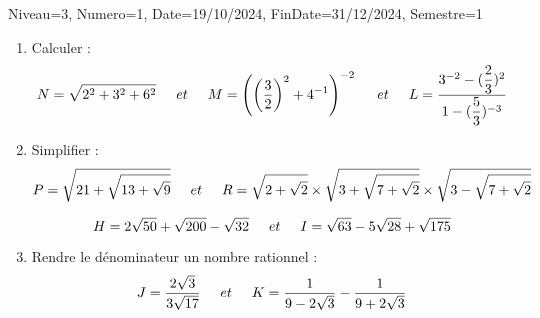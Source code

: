 \documentclass[a4paper,12pt]{article}
\begin{document}
\begin{Maquette}[DM]{Niveau=3, Numero=1, Date=19/10/2024, FinDate=31/12/2024, Semestre=1}
\begin{exercice}
\begin{enumerate}
\item Calculer :
\[
N=\sqrt{2^{2}+3^{2}+6^{2}}\hspace*{0.5cm}et\hspace*{0.5cm}
M=\left( \left( \dfrac{3}{2}\right)^{2}+4^{-1}\right)^{-2}  \hspace*{0.5cm}et\hspace*{0.5cm}
L=\dfrac{3^{-2}-(\dfrac{2}{3})^{2}}{1-(\dfrac{5}{3})^{-3}}
\]
\item Simplifier :
\[
P=\sqrt{21+\sqrt{13+\sqrt{9}}}\hspace*{0.5cm}et\hspace*{0.5cm}
R=\sqrt{2+\sqrt{2}}\times \sqrt{3+\sqrt{7+\sqrt{2}}}\times \sqrt{3-\sqrt{7+\sqrt{2}}}
\]

\[
H=2\sqrt{50}+\sqrt{200}-\sqrt{32}\hspace*{0.5 cm}et\hspace*{0.5 cm}
I=\sqrt{63}-5\sqrt{28}+\sqrt{175}
\]
\item Rendre le dénominateur un nombre rationnel :
\[
J=\dfrac{2\sqrt{3}}{3\sqrt{17}}\hspace*{0.5 cm}et\hspace*{0.5 cm}
K=\dfrac{1}{9-2\sqrt{3}}-\dfrac{1}{9+2\sqrt{3}}
\]
\end{enumerate}
\end{exercice}

\end{Maquette}
\end{document}
